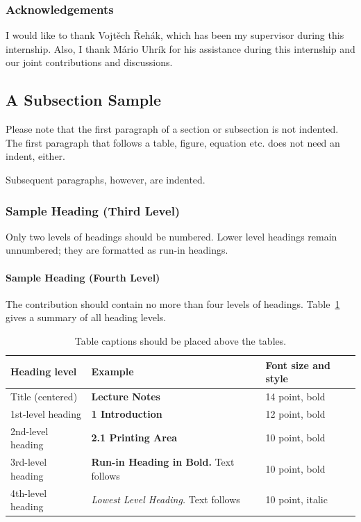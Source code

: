 \documentclass[runningheads,custombib]{llncs}
\begin{document}
\subsubsection*{Acknowledgements}
I would like to thank Vojt\v{e}ch \v{R}eh{\'{a}}k, which has been  my supervisor during this internship. Also, I thank M\'{a}rio Uhr\'{i}k for his assistance during this internship and our joint contributions and discussions. 

\iffalse
\subsection{A Subsection Sample}
Please note that the first paragraph of a section or subsection is
not indented. The first paragraph that follows a table, figure,
equation etc. does not need an indent, either.

Subsequent paragraphs, however, are indented.

\subsubsection{Sample Heading (Third Level)} Only two levels of
headings should be numbered. Lower level headings remain unnumbered;
they are formatted as run-in headings.

\paragraph{Sample Heading (Fourth Level)}
The contribution should contain no more than four levels of
headings. Table~\ref{tab1} gives a summary of all heading levels.

\begin{table}
\caption{Table captions should be placed above the
tables.}\label{tab1}
\begin{tabular}{|l|l|l|}
\hline
Heading level &  Example & Font size and style\\
\hline
Title (centered) &  {\Large\bfseries Lecture Notes} & 14 point, bold\\
1st-level heading &  {\large\bfseries 1 Introduction} & 12 point, bold\\
2nd-level heading & {\bfseries 2.1 Printing Area} & 10 point, bold\\
3rd-level heading & {\bfseries Run-in Heading in Bold.} Text follows & 10 point, bold\\
4th-level heading & {\itshape Lowest Level Heading.} Text follows & 10 point, italic\\
\hline
\end{tabular}
\end{table}
\end{document}
